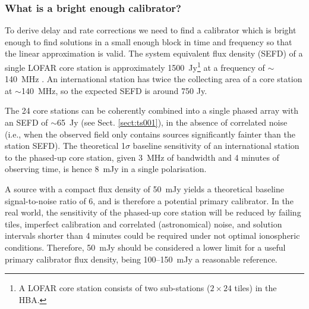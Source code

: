 \documentclass[graybox]{svmult}
\begin{document}
\subsubsection{What is a bright enough calibrator?}
To derive delay and rate corrections we need to find a calibrator which is
bright enough to find solutions in a small enough block in time and frequency
so that the linear approximation is valid. 
The system equivalent flux density (SEFD) of a single LOFAR core station is
approximately 1500~Jy\footnote{A LOFAR core station consists of two
sub-stations ($2\times24$ tiles) in the HBA.} at a frequency of $\sim$140~MHz
\citep{vanhaarlem13}.  An international station has twice the collecting area
of a core station at $\sim$140~MHz, so the expected SEFD is around 750 Jy.  

The 24 core stations can be coherently combined into a single phased array with
an SEFD of $\sim$65~Jy (see Sect. \ref{sect:ts001}), in the absence of correlated noise (i.e., when the
observed field only contains sources significantly fainter than the station
SEFD).  The theoretical 1$\sigma$ baseline sensitivity of an international
station to the phased-up core station, given 3~MHz of bandwidth and 4 minutes
of observing time, is hence 8~mJy in a single polarisation.  

A source with a
compact flux density of 50~mJy yields a theoretical baseline signal-to-noise
ratio of 6, and is therefore a potential primary calibrator. In the real world,
the sensitivity of the phased-up core station will be reduced by failing tiles,
imperfect calibration and correlated (astronomical) noise, and solution
intervals shorter than 4 minutes could be required under not optimal
ionospheric conditions.  Therefore, 50~mJy should be considered a lower limit
for a useful primary calibrator flux density, being 100--150~mJy a reasonable
reference.
\end{document}
